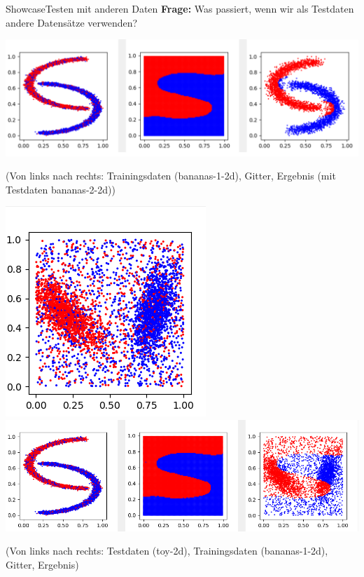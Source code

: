 \documentclass[9pt]{beamer}
\begin{document}
\begin{frame}{Showcase}{Testen mit anderen Daten}
\textbf{Frage:} Was passiert, wenn wir als Testdaten andere Datensätze verwenden?
\begin{center}\includegraphics[scale=0.25]{assets/changed_test_data.png}\end{center}
\begin{center}\begin{tiny}(Von links nach rechts: Trainingsdaten (bananas-1-2d), Gitter, Ergebnis (mit Testdaten bananas-2-2d))\end{tiny}\end{center}
\begin{center}\includegraphics[scale=0.33]{assets/toy-2d.png}\includegraphics[scale=0.33]{assets/changed_test_data2.png}\end{center}
\begin{center}\begin{tiny}(Von links nach rechts: Testdaten (toy-2d), Trainingsdaten (bananas-1-2d), Gitter, Ergebnis)\end{tiny}\end{center}
\end{frame}
\end{document}
